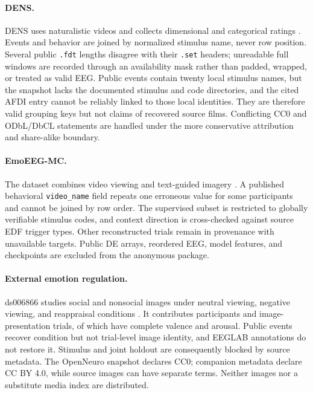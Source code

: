 \paragraph{DENS.}
DENS uses naturalistic videos and collects dimensional and categorical ratings
\citep{asif2023dens}. Events and behavior are joined by normalized stimulus
name, never row position. Several public \texttt{.fdt} lengths disagree with
their \texttt{.set} headers; unreadable full windows are recorded through an
availability mask rather than padded, wrapped, or treated as valid EEG. Public
events contain twenty local stimulus names, but the snapshot lacks the
documented stimulus and code directories, and the cited AFDI entry cannot be
reliably linked to those local identities. They are therefore valid grouping
keys but not claims of recovered source films. Conflicting CC0 and ODbL/DbCL
statements are handled under the more conservative attribution and share-alike
boundary. %

\paragraph{EmoEEG-MC.}
The dataset combines video viewing and text-guided imagery
\citep{xu2025emoeeg}. A published behavioral \texttt{video\_name} field repeats
one erroneous value for some participants and cannot be joined by row order.
The supervised subset is restricted to globally verifiable stimulus codes, and
context direction is cross-checked against source EDF trigger types. Other
reconstructed trials remain in provenance with unavailable targets. Public DE
arrays, reordered EEG, model features, and checkpoints are excluded from the
anonymous package. %

\paragraph{External emotion regulation.}
ds006866 studies social and nonsocial images under neutral viewing, negative
viewing, and reappraisal conditions \citep{maka2026discrepancy}. It contributes
 participants and  image-presentation trials,
of which  have complete valence and arousal. Public events
recover condition but not trial-level image identity, and EEGLAB annotations do
not restore it. Stimulus and joint holdout are consequently blocked by source
metadata. The OpenNeuro snapshot declares CC0; companion metadata declare CC BY
4.0, while source images can have separate terms. Neither images nor a
substitute media index are distributed. %

